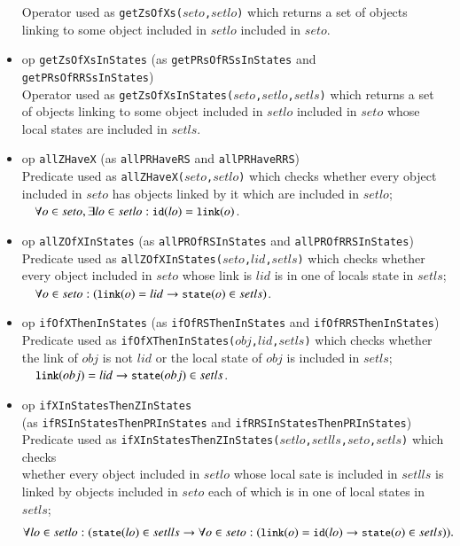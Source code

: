 \documentclass[12pt]{report}
\newcommand{\ra}{\rightarrow}
\newcommand{\mbstt}[1]{\mbox{\small{\tt {#1}}}}
\newcommand{\stt}[1]{{\small{\tt {#1}}}}
\begin{document}
\begin{itemize}
  Operator used as \stt{getZsOfXs($seto$,$setlo$)} which returns a set
  of objects linking to some object included in $setlo$ included in
  $seto$.
\item op \stt{getZsOfXsInStates} (as \stt{getPRsOfRSsInStates} and \stt{getPRsOfRRSsInStates})\\
  Operator used as \stt{getZsOfXsInStates($seto$,$setlo$,$setls$)}
  which returns a set of objects linking to some object included in
  $setlo$ included in $seto$ whose local states are included in
  $setls$.
\item op \stt{allZHaveX} (as \stt{allPRHaveRS} and \stt{allPRHaveRRS})\\
  Predicate used as \stt{allZHaveX($seto$,$setlo$)} which checks
  whether every object included in $seto$ has objects linked by it
  which are included in $setlo$;\\$~~~~\forall o\in seto,\exists lo\in
  setlo:\mbstt{id}(lo)=\mbstt{link}(o)$.
\item op \stt{allZOfXInStates} (as \stt{allPROfRSInStates} and \stt{allPROfRRSInStates})\\
  Predicate used as \stt{allZOfXInStates($seto$,$lid$,$setls$)} which
  checks whether every object included in $seto$ whose link is $lid$
  is in one of locals state in $setls$;\\$~~~~\forall o\in
  seto:(\mbstt{link}(o)=lid\ra\mbstt{state}(o)\in setls)$.
\item op \stt{ifOfXThenInStates} (as \stt{ifOfRSThenInStates} and \stt{ifOfRRSThenInStates})\\
  Predicate used as \stt{ifOfXThenInStates($obj$,$lid$,$setls$)} which
  checks whether the link of $obj$ is not $lid$ or the local state of
  $obj$ is included in
  $setls$;\\$~~~~\mbstt{link}(obj)=lid\ra\mbstt{state}(obj)\in setls$.
\item op \stt{ifXInStatesThenZInStates}\\
(as \stt{ifRSInStatesThenPRInStates} and \stt{ifRRSInStatesThenPRInStates})\\
  Predicate used as
  \stt{ifXInStatesThenZInStates($setlo$,$setlls$,$seto$,$setls$)}
  which checks\\ whether every object included in $setlo$ whose local
  sate is included in $setlls$ is linked by objects included in $seto$
  each of which is in one of local states in $setls$;
  \[
    \forall lo\in setlo:(\mbstt{state}(lo)\in setlls\ra \forall o\in
    seto: (\mbstt{link}(o)=\mbstt{id}(lo)\ra\mbstt{state}(o)\in
    setls)).
  \]
\end{itemize}
\end{document}
